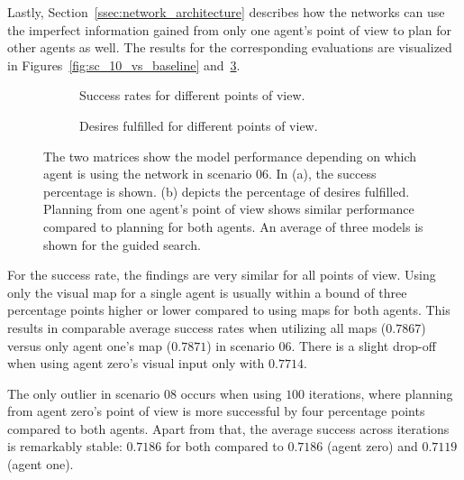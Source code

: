 Lastly, Section~\ref{ssec:network_architecture} describes how the networks can use the imperfect information gained from only one agent's point of view to plan for other agents as well. The results for the corresponding evaluations are visualized in Figures~\ref{fig:sc_10_vs_baseline} and~\ref{fig:sc_06_vs_baseline}.
\begin{figure}
\begin{subfigure}{.5\textwidth}
  \centering
  \scalebox{0.5}{
  
  }
  \caption{Success rates for different points of view.}
  \label{fig:sc06_success_matrix}
\end{subfigure}
\begin{subfigure}{.5\textwidth}
  \centering
  \scalebox{0.5}{
  
  }
  \caption{Desires fulfilled for different points of view.}
  \label{fig:sc06_desire_matrix}
\end{subfigure}
\caption[Success rate and desires fulfilled in scenario 06]{The two matrices show the model performance depending on which agent is using the network in scenario 06. In (a), the success percentage is shown. (b) depicts the percentage of desires fulfilled. Planning from one agent's point of view shows similar performance compared to planning for both agents. An average of three models is shown for the guided search.}
\label{fig:sc_06_vs_baseline}
\end{figure}
For the success rate, the findings are very similar for all points of view. Using only the visual map for a single agent is usually within a bound of three percentage points higher or lower compared to using maps for both agents. This results in comparable average success rates when utilizing all maps ($0.7867$) versus only agent one's map ($0.7871$) in scenario 06. There is a slight drop-off when using agent zero's visual input only with $0.7714$.

The only outlier in scenario 08 occurs when using $100$ iterations, where planning from agent zero's point of view is more successful by four percentage points compared to both agents. Apart from that, the average success across iterations is remarkably stable: $0.7186$ for both compared to $0.7186$ (agent zero) and $0.7119$ (agent one).

